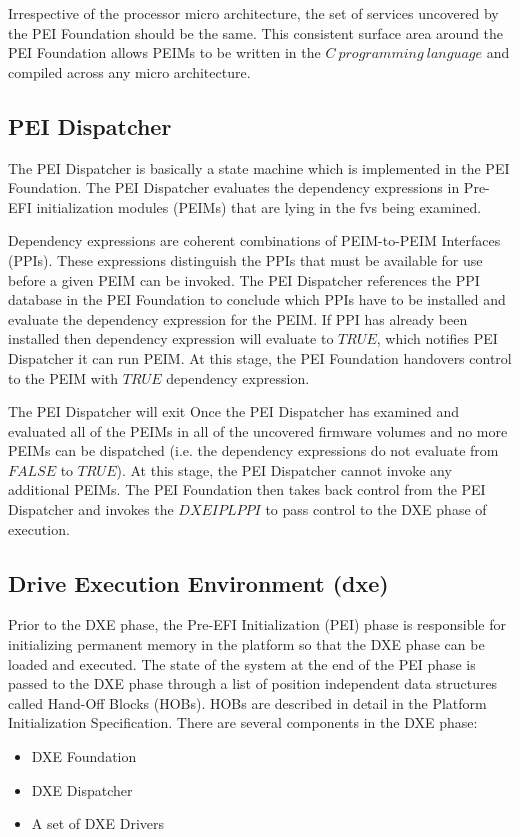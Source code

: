 Irrespective of the processor micro architecture, the set of services uncovered by the PEI Foundation should be the same. This consistent surface area around the PEI Foundation allows PEIMs to be written in the $C\ programming\ language$ and compiled across any micro architecture.

\subsection{PEI Dispatcher}
The PEI Dispatcher is basically a state machine which is implemented in the PEI Foundation. The PEI Dispatcher evaluates the dependency expressions in Pre-EFI initialization modules (PEIMs) that are lying in the \gls{fv}s being examined.

Dependency expressions are coherent combinations of PEIM-to-PEIM Interfaces (PPIs). These expressions distinguish the PPIs that must be available for use before a given PEIM can be invoked. The PEI Dispatcher references the PPI database in the PEI Foundation to conclude which PPIs have to be installed and evaluate the dependency expression for the PEIM. If PPI has already been installed then dependency expression will evaluate to $TRUE$, which notifies  PEI Dispatcher it can run PEIM. At this stage, the PEI Foundation handovers control to the PEIM with $TRUE$ dependency expression. 

The PEI Dispatcher will exit Once the PEI Dispatcher has examined and evaluated all of the PEIMs in all of the uncovered firmware volumes and no more PEIMs can be dispatched (i.e. the dependency expressions do not evaluate from $FALSE$ to $TRUE$). At this stage, the PEI Dispatcher cannot invoke any additional PEIMs. The PEI Foundation then takes back control from the PEI Dispatcher and invokes the $DXE IPL PPI$ to pass control to the DXE phase of execution.

\subsection{Drive Execution Environment (\gls{dxe})}
Prior to the DXE phase, the Pre-EFI Initialization (PEI) phase is responsible for initializing permanent memory in the platform so that the DXE phase can be loaded and executed. The state of the system at the end of the PEI phase is passed to the DXE phase through a list of position independent data structures called Hand-Off Blocks (HOBs). HOBs are described in detail in the Platform Initialization Specification.
There are several components in the DXE phase:
\begin{itemize}
	\item DXE Foundation
	\item DXE Dispatcher
	\item A set of DXE Drivers
\end{itemize}

